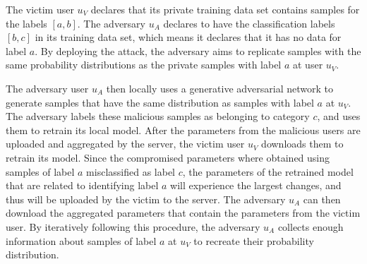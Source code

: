 \documentclass[conference]{IEEEtran}
\begin{document}
The victim user $u_V$ declares that its private training data set contains samples for the  labels $[a,b]$. The adversary
$u_A$ declares to have the classification labels $[b,c]$ in its training data set, which means it declares that it has no data for
label $a$. By deploying the attack, the adversary aims to replicate samples with the same probability distributions as the private
samples with label $a$ at user $u_V$.

The adversary user $u_A$ then locally uses a generative adversarial network to generate samples that have the same distribution as
samples with label $a$ at $u_V$. The adversary labels these malicious samples as belonging to category $c$, and uses them to retrain
its local model. After the parameters from the malicious users are uploaded and aggregated by the server, the victim user $u_V$
downloads them to retrain its model. Since the compromised parameters where obtained using samples of label $a$ misclassified as label
$c$, the parameters of the retrained model that are related to identifying label $a$ will experience the largest changes, and thus
will be uploaded by the victim to the server. The adversary $u_A$ can then download the aggregated parameters that contain the
parameters from the victim user. By iteratively following this procedure, the adversary $u_A$ collects enough information about samples
of label $a$ at $u_V$ to recreate their probability distribution. 

\end{document}
